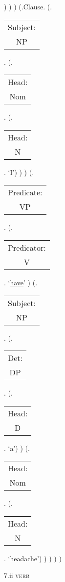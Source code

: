\documentclass[12pt,letterpaper]{article}
\begin{document}
\begin{figure}
\begin{center}
\begin{parsetree}
			)
			)
			)
			(.Clause.
			(.\begin{tabular}{c}Subject:\\NP\end{tabular}.  
			(.\begin{tabular}{c}Head:\\Nom\end{tabular}.
			(.\begin{tabular}{c}Head:\\N\end{tabular}. `I')
			)
			)
			(.\begin{tabular}{c}Predicate:\\VP\end{tabular}.
			(.\begin{tabular}{c}Predicator:\\V\end{tabular}.    `\underline{have}' )
			(.\begin{tabular}{c}Subject:\\NP\end{tabular}.
			(.\begin{tabular}{c}Det:\\DP\end{tabular}.
			(.\begin{tabular}{c}Head:\\D\end{tabular}. `a')
			)
			(.\begin{tabular}{c}Head:\\Nom\end{tabular}.
			(.\begin{tabular}{c}Head:\\N\end{tabular}. `headache')
			)
			)
			)
			)
			
			\hfill \break\hfill \break
		\end{parsetree}
		7.ii \textsc{verb}
	\end{center}
\end{figure}
\end{document}
